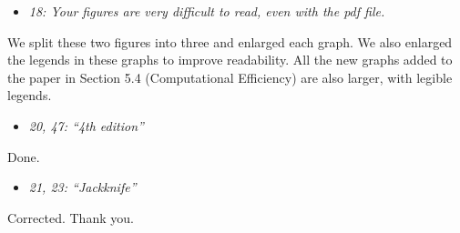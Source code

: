 \documentclass[11pt,notitlepage,onecolumn]{article}
\newcommand{\noi}{\noindent}
\begin{document}
\begin{itemize}
\item[] \textit{18: Your figures are very difficult to read, even with the pdf file.}
\end{itemize}

\noi
We split these two figures into three and enlarged each graph. 
We also enlarged the legends in these graphs to improve readability.
All the new graphs added to the paper in Section 5.4 (Computational Efficiency) are also larger, with legible legends. 
\medskip 



\begin{itemize}
\item[] \textit{20, 47: ``4th edition''}
\end{itemize}

\noi
Done.
\medskip 



\begin{itemize}
\item[] \textit{21, 23: ``\it Jackknife''}
\end{itemize}

\noi
Corrected. Thank you. 
\end{document}
